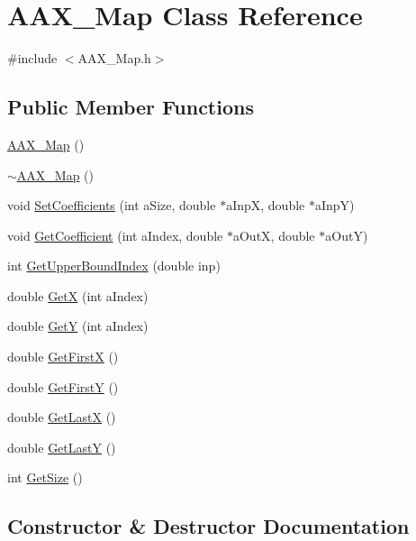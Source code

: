 \hypertarget{a01981}{}\section{A\+A\+X\+\_\+\+Map Class Reference}
\label{a01981}


{\ttfamily \#include $<$A\+A\+X\+\_\+\+Map.\+h$>$}

\subsection*{Public Member Functions}
\begin{DoxyCompactItemize}
\item 
\mbox{\hyperlink{a01981_af8f82cb6fc13729dde0eef7cd9ac3846}{A\+A\+X\+\_\+\+Map}} ()
\item 
\mbox{\hyperlink{a01981_a1ebcf52434b45b6e64f5a559efba9bdb}{$\sim$\+A\+A\+X\+\_\+\+Map}} ()
\item 
void \mbox{\hyperlink{a01981_a0023c63be213ba32b1c50eca2301edf7}{Set\+Coefficients}} (int a\+Size, double $\ast$a\+InpX, double $\ast$a\+InpY)
\item 
void \mbox{\hyperlink{a01981_a7776a526306675b9a302efea3941d41a}{Get\+Coefficient}} (int a\+Index, double $\ast$a\+OutX, double $\ast$a\+OutY)
\item 
int \mbox{\hyperlink{a01981_a20957b576d8a3a8b04596adf7c24ff07}{Get\+Upper\+Bound\+Index}} (double inp)
\item 
double \mbox{\hyperlink{a01981_a5448134aa48e106699d799d7cac3794d}{GetX}} (int a\+Index)
\item 
double \mbox{\hyperlink{a01981_a095b47a4216633fe5167e3d661f80371}{GetY}} (int a\+Index)
\item 
double \mbox{\hyperlink{a01981_a1933116dc2522c0d2196ed36c2d99bcc}{Get\+FirstX}} ()
\item 
double \mbox{\hyperlink{a01981_aa41cd9f24307874e62e07f75d637dde6}{Get\+FirstY}} ()
\item 
double \mbox{\hyperlink{a01981_a8f3190a633e010e6f521b8582705e29b}{Get\+LastX}} ()
\item 
double \mbox{\hyperlink{a01981_add422d45b54cd4c109a5764434bbe6d6}{Get\+LastY}} ()
\item 
int \mbox{\hyperlink{a01981_a51dd6cb01b5b743536765d559907de28}{Get\+Size}} ()
\end{DoxyCompactItemize}


\subsection{Constructor \& Destructor Documentation}
\mbox{\label{a01981_af8f82cb6fc13729dde0eef7cd9ac3846}} 
